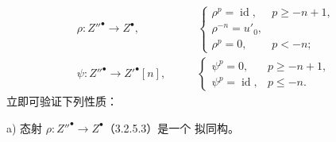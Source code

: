 \begin{equation}
\begin{aligned}
\rho\colon Z''^\bullet\longrightarrow Z^\bullet,
&\qquad
\begin{cases}
\rho^p=\operatorname{id},&p\geq -n+1,\\
\rho^{-n}=u'_0,&\\
\rho^p=0,&p<-n;
\end{cases}\\[3pt]
\psi\colon Z''^\bullet\longrightarrow {Z'}^\bullet[n],
&\qquad
\begin{cases}
\psi^p=0,&p\geq -n+1,\\
\psi^p=\operatorname{id},&p\leq -n.
\end{cases}
\end{aligned}
\tag{3.2.5.3}
\end{equation}
立即可验证下列性质：

\noindent a) 态射
$\rho\colon Z''^\bullet\longrightarrow Z^\bullet$（3.2.5.3）是一个
拟同构。
\endgroup
